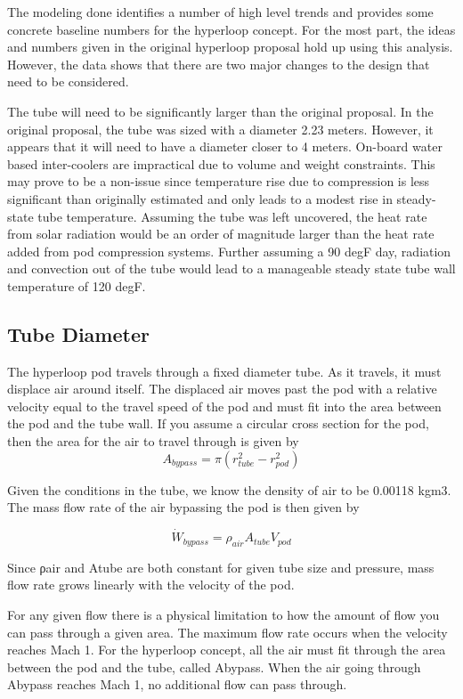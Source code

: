 \documentclass[heading.tex]{subfiles}
\begin{document}
The modeling done identifies a number of high level trends and provides some concrete baseline numbers for the hyperloop concept. For the most part, the ideas and numbers given in the original hyperloop proposal hold up using this analysis. However, the data shows that there are two major changes to the design that need to be considered.

The tube will need to be significantly larger than the original proposal. In the original proposal, the tube was sized with a diameter 2.23 meters. However, it appears that it will need to have a diameter closer to 4 meters.
On-board water based inter-coolers are impractical due to volume and weight constraints. This may prove to be a non-issue since temperature rise due to compression is less significant than originally estimated and only leads to a modest rise in steady-state tube temperature. Assuming the tube was left uncovered, the heat rate from solar radiation would be an order of magnitude larger than the heat rate added from pod compression systems. Further assuming a 90 degF day, radiation and convection out of the tube would lead to a manageable steady state tube wall temperature of 120 degF.

\subsection{Tube Diameter}
The hyperloop pod travels through a fixed diameter tube. As it travels, it must displace air around itself. The displaced air moves past the pod with a relative velocity equal to the travel speed of the pod and must fit into the area between the pod and the tube wall. If you assume a circular cross section for the pod, then the area for the air to travel through is given by
\begin{equation*}
A_{bypass} = \pi(r_{tube}^2-r_{pod}^2)
\end{equation*}


Given the conditions in the tube, we know the density of air to be 0.00118 kgm3. The mass flow rate of the air bypassing the pod is then given by

\begin{equation*}
\dot{W}_{bypass} = \rho_{air} A_{tube} V_{pod}
\end{equation*}

Since ρair and Atube are both constant for given tube size and pressure, mass flow rate grows linearly with the velocity of the pod.

For any given flow there is a physical limitation to how the amount of flow you can pass through a given area. The maximum flow rate occurs when the velocity reaches Mach 1. For the hyperloop concept, all the air must fit through the area between the pod and the tube, called Abypass. When the air going through Abypass reaches Mach 1, no additional flow can pass through.
\end{document}
